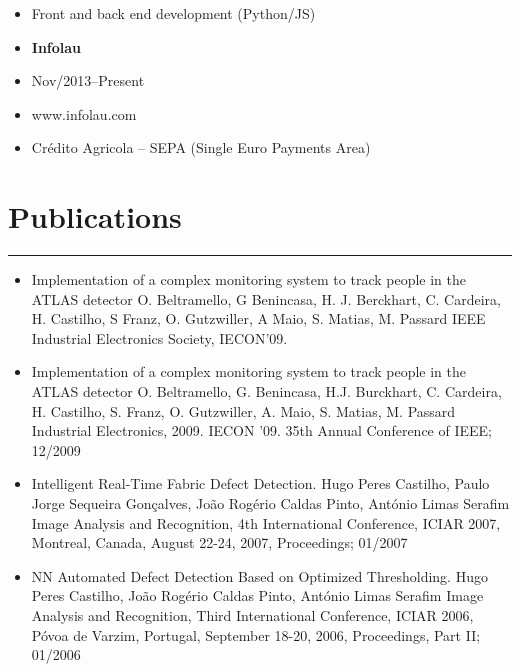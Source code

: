\documentclass[a4paper,english]{article}
\newcommand{\topic}[1]{
\section*{#1} \vspace{-6mm}
\rule{\columnwidth}{.25mm}
}
\begin{document}
\begin{minipage}[t]{0.5\linewidth}
    \begin{itemize}
    \setlength{\itemsep}{-1mm}
        \item[] Front and back end development (Python/JS)
    \end{itemize}
\end{minipage}
\vspace{0.5cm}
\begin{minipage}[t]{0.5\linewidth}
    \begin{itemize}
    \setlength{\itemsep}{-1mm}
        \item[] {\bf Infolau}
        \item[] Nov/2013--Present
        \item[] www.infolau.com
    \end{itemize}
\end{minipage}
\begin{minipage}[t]{0.5\linewidth}
    \begin{itemize}
    \setlength{\itemsep}{-1mm}
        \item[] Crédito Agricola -- SEPA (Single Euro Payments Area)
    \end{itemize}
\end{minipage}

\topic{Publications}

\noindent
\begin{itemize}
    \item[] Implementation of a complex monitoring system to track people in the ATLAS detector
    O. Beltramello, G Benincasa, H. J. Berckhart, C. Cardeira, H. Castilho, S Franz, O. Gutzwiller, A Maio, S. Matias, M. Passard
    IEEE Industrial Electronics Society, IECON'09.
    \item[] Implementation of a complex monitoring system to track people in the ATLAS detector
    O. Beltramello, G. Benincasa, H.J. Burckhart, C. Cardeira, H. Castilho, S. Franz, O. Gutzwiller, A. Maio, S. Matias, M. Passard
    Industrial Electronics, 2009. IECON '09. 35th Annual Conference of IEEE; 12/2009
    \item[] Intelligent Real-Time Fabric Defect Detection.
    Hugo Peres Castilho, Paulo Jorge Sequeira Gonçalves, João Rogério Caldas Pinto, António Limas Serafim
    Image Analysis and Recognition, 4th International Conference, ICIAR 2007, Montreal, Canada, August 22-24, 2007, Proceedings; 01/2007 
    \item[] NN Automated Defect Detection Based on Optimized Thresholding.
    Hugo Peres Castilho, João Rogério Caldas Pinto, António Limas Serafim
    Image Analysis and Recognition, Third International Conference, ICIAR 2006, Póvoa de Varzim, Portugal, September 18-20, 2006, Proceedings, Part II; 01/2006
\end{itemize}
\end{document}
